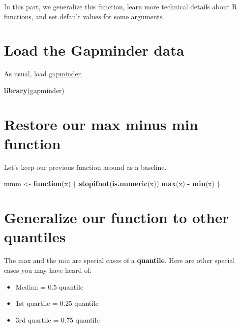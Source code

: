 \documentclass[
]{book}
\newenvironment{Shaded}{\begin{snugshade}}{\end{snugshade}}
\newcommand{\ControlFlowTok}[1]{\textcolor[rgb]{0.13,0.29,0.53}{\textbf{#1}}}
\newcommand{\KeywordTok}[1]{\textcolor[rgb]{0.13,0.29,0.53}{\textbf{#1}}}
\newcommand{\NormalTok}[1]{#1}
\newcommand{\OperatorTok}[1]{\textcolor[rgb]{0.81,0.36,0.00}{\textbf{#1}}}
\newcommand{\StringTok}[1]{\textcolor[rgb]{0.31,0.60,0.02}{#1}}
\providecommand{\tightlist}{%
  \setlength{\itemsep}{0pt}\setlength{\parskip}{0pt}}
\begin{document}
In this part, we generalize this function, learn more technical details about R functions, and set default values for some arguments.

\hypertarget{load-the-gapminder-data}{%
\section{Load the Gapminder data}\label{load-the-gapminder-data}}

As usual, load \href{https://github.com/jennybc/gapminder}{gapminder}.

\begin{Shaded}
\begin{Highlighting}[]
\KeywordTok{library}\NormalTok{(gapminder)}
\end{Highlighting}
\end{Shaded}

\hypertarget{restore-our-max-minus-min-function}{%
\section{Restore our max minus min function}\label{restore-our-max-minus-min-function}}

Let's keep our previous function around as a baseline.

\begin{Shaded}
\begin{Highlighting}[]
\NormalTok{mmm <-}\StringTok{ }\ControlFlowTok{function}\NormalTok{(x) \{}
  \KeywordTok{stopifnot}\NormalTok{(}\KeywordTok{is.numeric}\NormalTok{(x))}
  \KeywordTok{max}\NormalTok{(x) }\OperatorTok{-}\StringTok{ }\KeywordTok{min}\NormalTok{(x)}
\NormalTok{\}}
\end{Highlighting}
\end{Shaded}

\hypertarget{generalize-our-function-to-other-quantiles}{%
\section{Generalize our function to other quantiles}\label{generalize-our-function-to-other-quantiles}}

The max and the min are special cases of a \textbf{quantile}. Here are other special cases you may have heard of:

\begin{itemize}
\tightlist
\item
  Median = 0.5 quantile
\item
  1st quartile = 0.25 quantile
\item
  3rd quartile = 0.75 quantile
\end{itemize}
\end{document}
